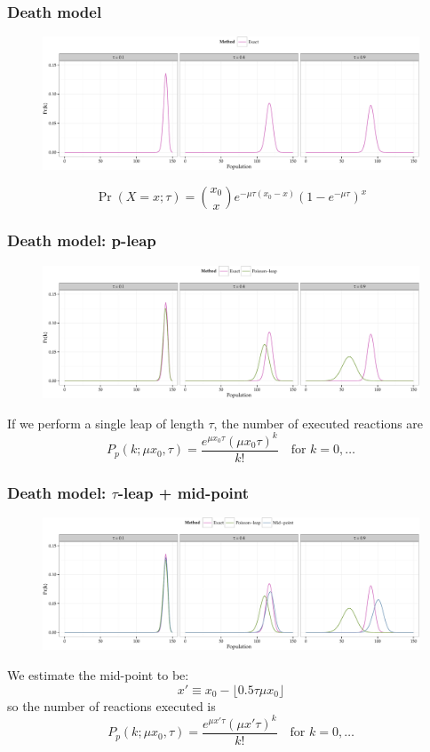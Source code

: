 \documentclass[t,compress]{beamer}
\begin{document}
\begin{frame}
  \frametitle{Death model} 
\vspace{-0.6cm}
\begin{figure}[t]
\centering
\includegraphics[width=\textwidth]{figure3a-crop}

\end{figure}
\[
\Pr(X=x; \tau) = \binom{x_0}{x} e^{-\mu \tau(x_0-x)} (1-e^{-\mu \tau })^x
\]
\end{frame}



\begin{frame}
  \frametitle{Death model: p-leap} 
\vspace{-0.6cm}
\begin{figure}[t]
\centering
\includegraphics[width=\textwidth]{figure3b-crop}
\end{figure}
If we perform a single leap of length $\tau$, the number of executed reactions are
\[
P_p(k; \mu x_0, \tau) =\frac{e^{\mu x_0 \tau} (\mu x_0 \tau)^k}{k!} \quad
\text{for } k=0, \ldots
\]

\end{frame}



\begin{frame}
  \frametitle{Death model: $\tau$-leap + mid-point}
\vspace{-0.6cm}
\begin{figure}[t]
\centering 
\includegraphics[width=\textwidth]{figure3c-crop}
\end{figure}
We estimate the mid-point to be:
\[ 
x' \equiv x_0 - \lfloor 0.5 \tau \mu x_0 \rfloor  
\]
so the number of reactions executed is
\[
P_p(k; \mu x_0, \tau) =\frac{e^{\mu x' \tau} (\mu x' \tau)^k}{k!} \quad
\text{for } k=0, \ldots
\]

\end{frame}
\end{document}
